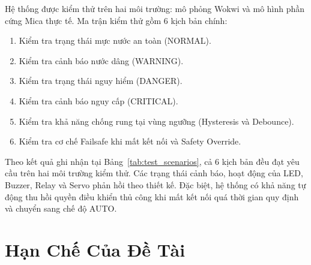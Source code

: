 Hệ thống được kiểm thử trên hai môi trường: mô phỏng Wokwi và mô hình phần cứng Mica thực tế. Ma trận kiểm thử gồm 6 kịch bản chính:
\begin{enumerate}
    \item Kiểm tra trạng thái mực nước an toàn (NORMAL).
    \item Kiểm tra cảnh báo nước dâng (WARNING).
    \item Kiểm tra trạng thái nguy hiểm (DANGER).
    \item Kiểm tra cảnh báo nguy cấp (CRITICAL).
    \item Kiểm tra khả năng chống rung tại vùng ngưỡng (Hysteresis và Debounce).
    \item Kiểm tra cơ chế Failsafe khi mất kết nối và Safety Override.
\end{enumerate}

Theo kết quả ghi nhận tại Bảng~\ref{tab:test_scenarios}, cả 6 kịch bản đều đạt yêu cầu trên hai môi trường kiểm thử. Các trạng thái cảnh báo, hoạt động của LED, Buzzer, Relay và Servo phản hồi theo thiết kế. Đặc biệt, hệ thống có khả năng tự động thu hồi quyền điều khiển thủ công khi mất kết nối quá thời gian quy định và chuyển sang chế độ AUTO.

\section{Hạn Chế Của Đề Tài}

